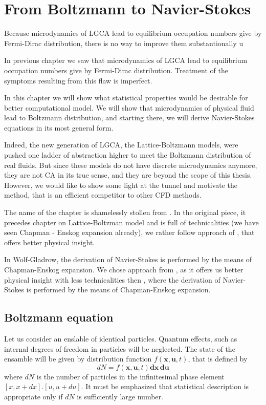 \chapter{From Boltzmann to Navier-Stokes}

Because microdynamics of LGCA lead to equilibrium occupation numbers give by Fermi-Dirac distribution, there is no way to improve them substantionally u

In previous chapter we saw that microdynamics of LGCA lead to equilibrium occupation numbers give by Fermi-Dirac distribution.
Treatment of the symptoms resulting from this flaw is imperfect.

In this chapter we will show what statistical properties would be desirable for better computational model.
We will show that microdynamics of physical fluid lead to Boltzmann distribution, and starting there, we will derive Navier-Stokes equations in its most general form.
 
Indeed, the new generation of LGCA, the Lattice-Boltzmann models, were pushed one ladder of abstraction higher to meet the Boltzmann distribution of real fluids.
But since these models do not have discrete microdynamics anymore, they are not CA in its true sense, and they are beyond the scope of this thesis.
However, we would like to show some light at the tunnel and motivate the method, that is an efficient competitor to other CFD methods.

\bigskip
The name of the chapter is shamelessly stollen from \cite{wolf}. In the original piece, it precedes chapter on Lattice-Boltzman model and is full of technicalities (we have seen Chapman - Enskog expansion already), we rather follow approach of \cite{astro}, that offers better physical insight.

In Wolf-Gladrow, the derivation of Navier-Stokes is performed by the means of Chapman-Enskog expansion.
We chose approach from \cite{astro}, as it offers us better physical insight with less technicalities then \cite{wolf}, where the derivation of Navier-Stokes is performed by the means of Chapman-Enskog expansion.

\section{Boltzmann equation}

Let us consider an enslable of identical particles. Quantum effects, such as internal degrees of freedom in particles will be neglected. The state of the ensamble will be given by distribution function $f(\bm{x}, \bm{u}, t)$, that is defined by
\begin{equation} \label{hust}
dN = f(\bm{x}, \bm{u}, t) \bm{dx \, du}
\end{equation} 
where $dN$ is the number of particles in the infinitesimal phase element $[x, x+ dx].[u, u +du]$.
It must be emphasized that statistical description is appropriate only if $dN$ is sufficiently large number.

